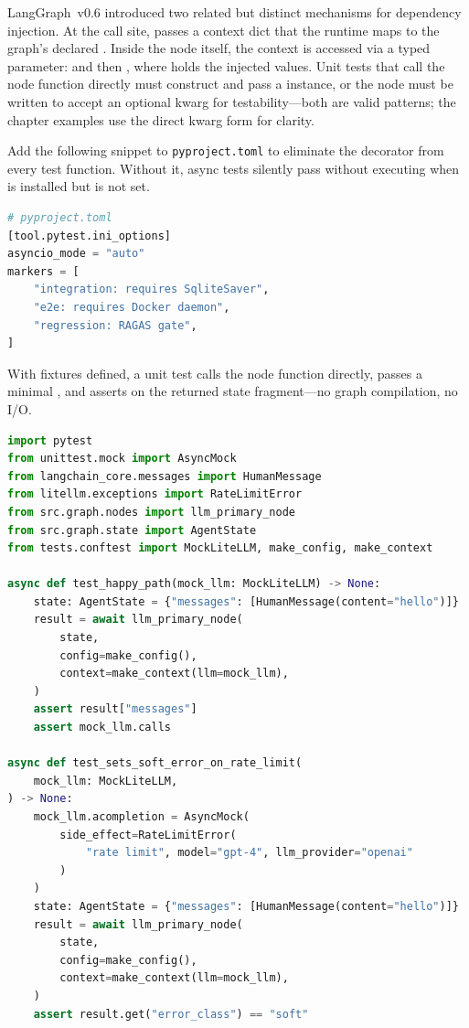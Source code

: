 \begin{notebox}
LangGraph~v0.6 introduced two related but distinct mechanisms for
dependency injection.
At the call site, 
passes a context dict that the runtime maps to the graph's declared
.
Inside the node itself, the context is accessed via a typed
 parameter:  and
then ,
where  holds the injected values.
Unit tests that call the node function directly must construct and pass
a  instance, or the node must be written to accept an
optional  kwarg for testability---both are valid
patterns; the chapter examples use the direct kwarg form for clarity.
\end{notebox}

\begin{tipbox}
Add the following snippet to \texttt{pyproject.toml} to eliminate the
 decorator from every test function.
Without it, async tests silently pass without executing when
 is installed but  is not set.
\begin{lstlisting}[language=Python]
# pyproject.toml
[tool.pytest.ini_options]
asyncio_mode = "auto"
markers = [
    "integration: requires SqliteSaver",
    "e2e: requires Docker daemon",
    "regression: RAGAS gate",
]
\end{lstlisting}
\end{tipbox}

With fixtures defined, a unit test calls the node function directly,
passes a minimal , and asserts on the returned state
fragment---no graph compilation, no I/O.

\begin{lstlisting}[language=Python, caption={Unit tests for the primary
  LLM node (\texttt{tests/unit/test\_llm\_primary\_node.py}).},
  label={lst:unit-node}]
import pytest
from unittest.mock import AsyncMock
from langchain_core.messages import HumanMessage
from litellm.exceptions import RateLimitError
from src.graph.nodes import llm_primary_node
from src.graph.state import AgentState
from tests.conftest import MockLiteLLM, make_config, make_context

async def test_happy_path(mock_llm: MockLiteLLM) -> None:
    state: AgentState = {"messages": [HumanMessage(content="hello")]}
    result = await llm_primary_node(
        state,
        config=make_config(),
        context=make_context(llm=mock_llm),
    )
    assert result["messages"]
    assert mock_llm.calls

async def test_sets_soft_error_on_rate_limit(
    mock_llm: MockLiteLLM,
) -> None:
    mock_llm.acompletion = AsyncMock(
        side_effect=RateLimitError(
            "rate limit", model="gpt-4", llm_provider="openai"
        )
    )
    state: AgentState = {"messages": [HumanMessage(content="hello")]}
    result = await llm_primary_node(
        state,
        config=make_config(),
        context=make_context(llm=mock_llm),
    )
    assert result.get("error_class") == "soft"
\end{lstlisting}

